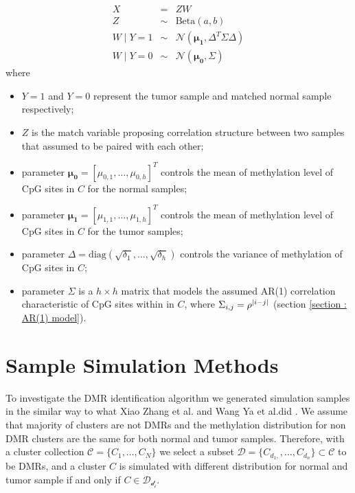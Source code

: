 \documentclass{report}
\begin{document}
\begin{equation}
    \begin{array}{rcl} \label{eqantion : statistical definiton}
    X &=& Z W
    \\
     Z &\sim& \mathrm{Beta}(a,b)
     \\ 
     W\mid Y= 1 &\sim& \mathcal{N}( \boldsymbol{\mu_1}, \Delta^T \Sigma \Delta)
     \\
     W\mid Y= 0 &\sim&  \mathcal{N}( \boldsymbol{\mu_0}, \Sigma )
    \end{array}
\end{equation}
where 
    \begin{itemize}
        \item $Y = 1$ and $Y=0$ represent the tumor sample and matched normal sample respectively;
        \item $Z$ is the match variable proposing correlation structure between two samples that assumed to be paired with each other;
        \item parameter $\boldsymbol{\mu_0} = [\mu_{0,1}, \ldots,\mu_{0,h}]^T$ controls the mean of methylation level of CpG sites in $C$ for the normal samples;
        \item parameter $\boldsymbol{\mu_1} = [\mu_{1,1}, \ldots,\mu_{1,h}]^T$ controls the mean of methylation level of CpG sites in $C$ for the tumor samples;
        \item parameter $\Delta = \mathrm{diag}(\sqrt{\delta_1}, \ldots, \sqrt{\delta_h})$ controls the variance of methylation of CpG sites in $C$;
        \item parameter $\Sigma$ is a $h \times h$ matrix that models the assumed AR(1) correlation characteristic of CpG sites within in $C$, where $\Sigma_{i,j} = \rho^{\abs{i-j}}$ (section \ref{section : AR(1) model}). 
    \end{itemize}


\section{Sample Simulation Methods}

\par
To investigate the DMR identification algorithm we generated simulation samples in the similar way to what Xiao Zhang et al. and Wang Ya et al.did \cite{zhang2018data,wang2017accounting}. We assume that majority of clusters are not
DMRs and the methylation distribution for non DMR clusters are the same for both normal and tumor samples. Therefore, with a cluster collection $\mathcal{C} = \{C_1,\ldots,C_N\}$ we select a
subset $\mathcal{D} = \{C_{d_1,},\ldots,C_{d_n}\} \subset \mathcal{C}$ to be DMRs, and a cluster $C$ is simulated with different distribution for normal and
tumor sample if and only if $C \in \mathcal{D_{d_i}}$.
\end{document}
